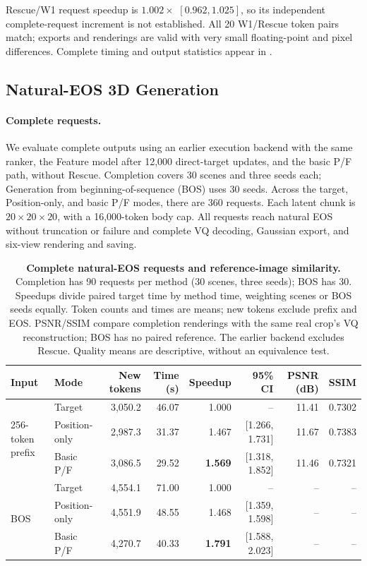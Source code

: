 Rescue/W1 request speedup is $1.002\times$ $[0.962,1.025]$, so its independent complete-request increment is not established. All 20 W1/Rescue token pairs match; exports and renderings are valid with very small floating-point and pixel differences. Complete timing and output statistics appear in .

\subsection{Natural-EOS 3D Generation}
\label{sec:eos}
\paragraph{Complete requests.}
We evaluate complete outputs using an earlier execution backend with the same ranker, the Feature model after 12,000 direct-target updates, and the basic P/F path, without Rescue. Completion covers 30 scenes and three seeds each; Generation from beginning-of-sequence (BOS) uses 30 seeds. Across the target, Position-only, and basic P/F modes, there are 360 requests. Each latent chunk is $20\times20\times20$, with a 16,000-token body cap. All requests reach natural EOS without truncation or failure and complete VQ decoding, Gaussian export, and six-view rendering and saving.

\begin{table}[t]
\centering\small
\caption{\textbf{Complete natural-EOS requests and reference-image similarity.} Completion has 90 requests per method (30 scenes, three seeds); BOS has 30. Speedups divide paired target time by method time, weighting scenes or BOS seeds equally. Token counts and times are means; new tokens exclude prefix and EOS. PSNR/SSIM compare completion renderings with the same real crop's VQ reconstruction; BOS has no paired reference. The earlier backend excludes Rescue. Quality means are descriptive, without an equivalence test.}
\label{tab:eos}
\label{tab:quality}
\begin{tabular}{@{}llrrrrrr@{}}\toprule
Input & Mode & New tokens & Time (s) & Speedup & 95\% CI & PSNR (dB) & SSIM\\\midrule
\multirow{3}{*}{256-token prefix} & Target & 3,050.2 & 46.07 & 1.000 & -- & 11.41 & 0.7302\\
& Position-only & 2,987.3 & 31.37 & 1.467 & [1.266, 1.731] & 11.67 & 0.7383\\
& Basic P/F & 3,086.5 & 29.52 & \textbf{1.569} & [1.318, 1.852] & 11.46 & 0.7321\\\midrule
\multirow{3}{*}{BOS} & Target & 4,554.1 & 71.00 & 1.000 & -- & -- & --\\
& Position-only & 4,551.9 & 48.55 & 1.468 & [1.359, 1.598] & -- & --\\
& Basic P/F & 4,270.7 & 40.33 & \textbf{1.791} & [1.588, 2.023] & -- & --\\\bottomrule
\end{tabular}
\end{table}

